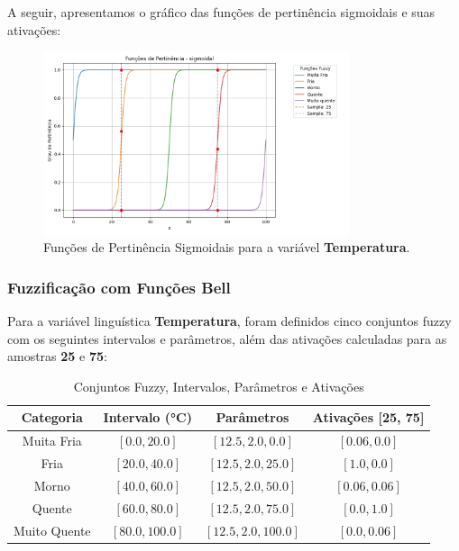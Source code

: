 \documentclass[a4paper,12pt]{article}
\begin{document}
A seguir, apresentamos o gráfico das funções de pertinência sigmoidais e suas ativações:

\begin{figure}[H]
    \centering
    \includegraphics[width=0.8\textwidth]{img/funções_de_pertinência_sigmoidal_fuzzificado.png}
    \caption{Funções de Pertinência Sigmoidais para a variável \textbf{Temperatura}.}
\end{figure}

\subsubsection{Fuzzificação com Funções Bell}

Para a variável linguística \textbf{Temperatura}, foram definidos cinco conjuntos fuzzy com os seguintes intervalos e parâmetros, além das ativações calculadas para as amostras \textbf{25} e \textbf{75}:

\begin{table}[H]
\centering
\caption{Conjuntos Fuzzy, Intervalos, Parâmetros e Ativações}
\begin{tabular}{|c|c|c|c|}
\hline
\textbf{Categoria}    & \textbf{Intervalo (°C)} & \textbf{Parâmetros}       & \textbf{Ativações [25, 75]} \\ \hline
Muita Fria            & $[0.0, 20.0]$          & $[12.5, 2.0, 0.0]$        & $[0.06, 0.0]$              \\ \hline
Fria                  & $[20.0, 40.0]$         & $[12.5, 2.0, 25.0]$       & $[1.0, 0.0]$               \\ \hline
Morno                 & $[40.0, 60.0]$         & $[12.5, 2.0, 50.0]$       & $[0.06, 0.06]$             \\ \hline
Quente                & $[60.0, 80.0]$         & $[12.5, 2.0, 75.0]$       & $[0.0, 1.0]$               \\ \hline
Muito Quente          & $[80.0, 100.0]$        & $[12.5, 2.0, 100.0]$      & $[0.0, 0.06]$              \\ \hline
\end{tabular}
\end{table}
\end{document}
